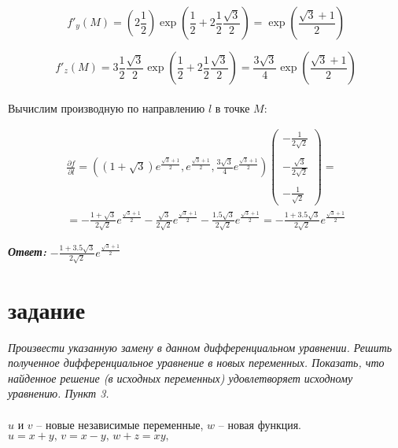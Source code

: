 \documentclass[a5paper, 10pt]{article}
\theoremstyle{definition}
\theoremstyle{plain}
\theoremstyle{remark}
\begin{document}
\begin{equation}
f'_y  \left( M \right) =  \left( 2\frac{1}{2}  \right) \exp \left(\frac{1}{2} + 2\frac{1}{2}\frac{\sqrt{3}}{2} \right) =
\exp \left(\frac{\sqrt{3} + 1}{2} \right)
\end{equation}

\begin{equation}
f'_z  \left( M \right) = 3\frac{1}{2}\frac{\sqrt{3}}{2} \exp \left(\frac{1}{2} + 2\frac{1}{2}\frac{\sqrt{3}}{2} \right) =
\frac{3 \sqrt{3}}{4} \exp \left(\frac{\sqrt{3} + 1}{2} \right)
\end{equation}
\\
Вычислим производную по направлению $l$ в точке $M$:

\begin{multline}
\frac{\partial f}{\partial l} = \left(\left(1 + \sqrt{3} \right) e^{ \frac{\sqrt{3} + 1}{2}} , e^{ \frac{\sqrt{3} + 1}{2}}, \frac{3 \sqrt{3}}{4} e^{ \frac{\sqrt{3} + 1}{2}  } \right)
\begin{pmatrix}
 -\frac{1}{2\sqrt{2}}\\
\\
- \frac{\sqrt{3}}{2\sqrt{2}}\\
\\
- \frac{1}{\sqrt{2}}
\end{pmatrix}
= \\
=   -\frac{1 + \sqrt{3}}{2\sqrt{2}} e^{ \frac{\sqrt{3} + 1}{2}} - \frac{\sqrt{3}}{2\sqrt{2}}  e^{ \frac{\sqrt{3} + 1}{2}}
 - \frac{1.5 \sqrt{3}}{2\sqrt{2}}  e^{ \frac{\sqrt{3} + 1}{2}}  =  - \frac{1 + 3.5 \sqrt{3}}{2\sqrt{2}}  e^{ \frac{\sqrt{3} + 1}{2}} 
\end{multline}

\textit{\textbf{Ответ:}} $ - \frac{1 + 3.5 \sqrt{3}}{2\sqrt{2}}  e^{ \frac{\sqrt{3} + 1}{2}} $





\newpage

\section{задание}
\textit{Произвести указанную замену в данном дифференциальном уравнении. Решить полученное дифференциальное уравнение в новых переменных. Показать, что найденное решение (в исходных переменных) удовлетворяет исходному уравнению. Пункт 3.}\\
\\
$u$ и $v$ -- новые независимые переменные, $w$ -- новая функция. $u=x+y, \, v = x - y, \, w+z = xy,$
\end{document}
